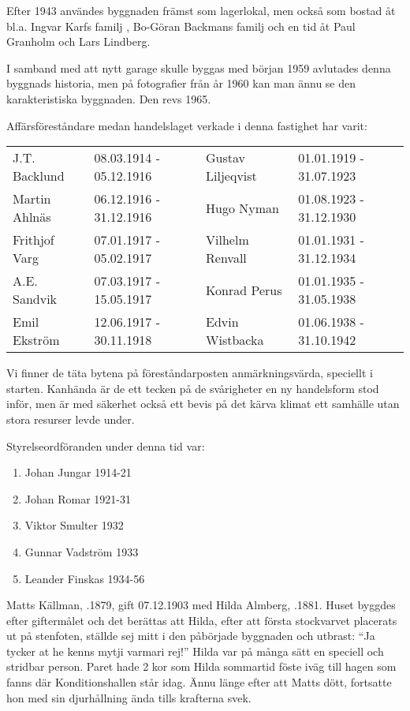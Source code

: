 Efter 1943 användes byggnaden främst som lagerlokal, men också  som bostad åt bl.a. Ingvar Karfs familj , Bo-Göran Backmans familj och en tid åt Paul Granholm och Lars Lindberg.

I samband med att nytt garage skulle byggas med början 1959 avlutades denna byggnads historia, men på fotografier från år 1960 kan man ännu se den karakteristiska byggnaden. Den revs 1965.

Affärsföreståndare medan handelslaget verkade i denna fastighet har varit:
\begin{center}
  \begin{tabular}{l l l l}
    \hline
    J.T. Backlund & 08.03.1914 - 05.12.1916 & Gustav Liljeqvist & 01.01.1919 - 31.07.1923 \\
    Martin Ahlnäs & 06.12.1916 - 31.12.1916 & Hugo Nyman & 01.08.1923 - 31.12.1930 \\
    Frithjof Varg & 07.01.1917 - 05.02.1917 & Vilhelm Renvall & 01.01.1931 - 31.12.1934 \\
    A.E. Sandvik & 07.03.1917 - 15.05.1917 & Konrad Perus & 01.01.1935 - 31.05.1938 \\
    Emil Ekström & 12.06.1917 - 30.11.1918 & Edvin Wistbacka & 01.06.1938 - 31.10.1942 \\ \hline
  \end{tabular}
\end{center}

Vi finner de täta bytena på föreståndarposten anmärkningsvärda, speciellt i starten. Kanhända är de ett tecken på de svårigheter en ny handelsform stod inför, men är med säkerhet också ett bevis på det kärva klimat ett samhälle utan stora resurser levde under.

Styrelseordföranden under denna tid var:
\begin{enumerate}
  \item Johan Jungar     1914-21
  \item Johan Romar      1921-31
  \item Viktor Smulter   1932
  \item Gunnar Vadström  1933
  \item Leander Finskas  1934-56
\end{enumerate}




Matts Källman, .1879, gift 07.12.1903 med Hilda Almberg, .1881. Huset byggdes efter giftermålet och det berättas att Hilda, efter att första stockvarvet placerats ut på stenfoten, ställde sej mitt i den påbörjade byggnaden och utbrast: ``Ja tycker at he kenns mytji varmari rej!'' Hilda var på många sätt en speciell och stridbar person. Paret hade 2 kor som Hilda sommartid föste iväg till hagen som fanns där Konditionshallen står idag. Ännu länge efter att Matts dött, fortsatte hon med sin djurhållning ända tills krafterna svek.

